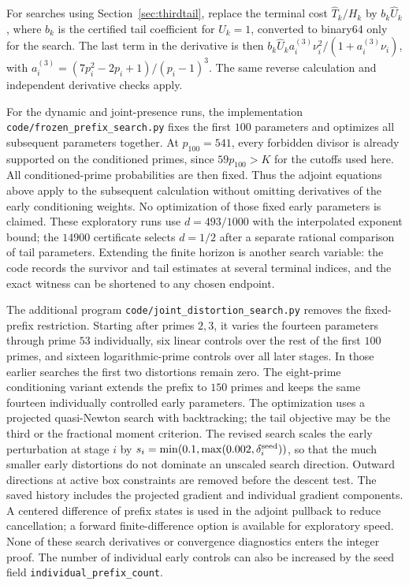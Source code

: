 \documentclass[11pt]{article}
\begin{document}
For searches using Section~\ref{sec:thirdtail}, replace the terminal cost
$\widehat T_k/H_k$ by $b_k\widehat U_k$, where $b_k$ is the certified
tail coefficient for $U_k=1$, converted to binary64 only for the search.
The last term in the derivative is then
$b_k\widehat U_k a_i^{(3)}\nu_i^2/(1+a_i^{(3)}\nu_i)$, with
$a_i^{(3)}=(7p_i^2-2p_i+1)/(p_i-1)^3$. The same reverse calculation and
independent derivative checks apply.

For the dynamic and joint-presence runs, the implementation
\texttt{code/frozen\_prefix\_search.py} fixes the first $100$ parameters
and optimizes all subsequent parameters together. At $p_{100}=541$,
every forbidden divisor is already supported on the conditioned primes,
since $59p_{100}>K$ for the cutoffs used here. All conditioned-prime
probabilities are then fixed. Thus the adjoint equations above apply to
the subsequent calculation without omitting derivatives of the early
conditioning weights. No optimization of those fixed early parameters is
claimed. These exploratory runs use $d=493/1000$ with the interpolated
exponent bound; the $14900$ certificate selects $d=1/2$ after a
separate rational comparison of tail parameters. Extending the finite horizon is another search variable:
the code records the survivor and tail estimates at several terminal
indices, and the exact witness can be shortened to any chosen endpoint.

The additional program \texttt{code/joint\_distortion\_search.py} removes
the fixed-prefix restriction. Starting after primes $2,3$, it varies the
fourteen parameters through prime $53$ individually, six linear controls
over the rest of the first $100$ primes, and sixteen logarithmic-prime
controls over all later stages. In those earlier searches the first two
distortions remain zero.
The eight-prime conditioning variant extends the prefix to $150$ primes
and keeps the same fourteen individually controlled early parameters.
The optimization uses a projected quasi-Newton search with backtracking;
the tail objective may be the third or the fractional moment criterion.
The revised search scales the early perturbation at stage $i$ by
$s_i=\min(0.1,\max(0.002,\delta_i^{\rm seed}))$, so that the much smaller
early distortions do not dominate an unscaled search direction. Outward
directions at active box constraints are removed before the descent test.
The saved history includes the projected gradient and individual gradient
components. A centered difference of prefix states is used in the adjoint
pullback to reduce cancellation; a forward finite-difference option is
available for exploratory speed. None of these search derivatives or
convergence diagnostics enters the integer proof. The number of individual
early controls can also be increased by the seed field
\texttt{individual\_prefix\_count}.
\end{document}
